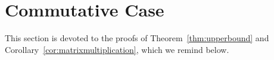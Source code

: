 \documentclass[review,onefignum,onetabnum]{siamart190516}
\begin{document}





%
%
%
%
%
%

\section{Commutative Case}\label{sec-commutative}

This section is devoted to the proofs of Theorem~\ref{thm:upperbound} and
Corollary~\ref{cor:matrixmultiplication}, which we remind below.

\upperthm*
\end{document}
